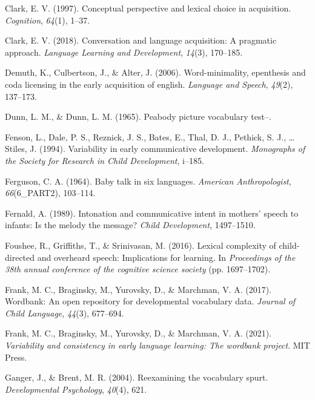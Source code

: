 \documentclass[10pt, letterpaper]{article}
\newenvironment{CSLReferences}%
  {}%
  {\par}
\begin{document}
\begin{CSLReferences}{1}{0}
\leavevmode\hypertarget{ref-clark1997conceptual}{}%
Clark, E. V. (1997). Conceptual perspective and lexical choice in
acquisition. \emph{Cognition}, \emph{64}(1), 1--37.

\leavevmode\hypertarget{ref-clark2018conversation}{}%
Clark, E. V. (2018). Conversation and language acquisition: A pragmatic
approach. \emph{Language Learning and Development}, \emph{14}(3),
170--185.

\leavevmode\hypertarget{ref-demuth2006word}{}%
Demuth, K., Culbertson, J., \& Alter, J. (2006). Word-minimality,
epenthesis and coda licensing in the early acquisition of english.
\emph{Language and Speech}, \emph{49}(2), 137--173.

\leavevmode\hypertarget{ref-dunn1965peabody}{}%
Dunn, L. M., \& Dunn, L. M. (1965). Peabody picture vocabulary test--.

\leavevmode\hypertarget{ref-fenson1994variability}{}%
Fenson, L., Dale, P. S., Reznick, J. S., Bates, E., Thal, D. J.,
Pethick, S. J., \ldots{} Stiles, J. (1994). Variability in early
communicative development. \emph{Monographs of the Society for Research
in Child Development}, i--185.

\leavevmode\hypertarget{ref-ferguson1964baby}{}%
Ferguson, C. A. (1964). Baby talk in six languages. \emph{American
Anthropologist}, \emph{66}(6\_PART2), 103--114.

\leavevmode\hypertarget{ref-fernald1989intonation}{}%
Fernald, A. (1989). Intonation and communicative intent in mothers'
speech to infants: Is the melody the message? \emph{Child Development},
1497--1510.

\leavevmode\hypertarget{ref-foushee2016lexical}{}%
Foushee, R., Griffiths, T., \& Srinivasan, M. (2016). Lexical complexity
of child-directed and overheard speech: Implications for learning. In
\emph{Proceedings of the 38th annual conference of the cognitive science
society} (pp. 1697--1702).

\leavevmode\hypertarget{ref-frank2017wordbank}{}%
Frank, M. C., Braginsky, M., Yurovsky, D., \& Marchman, V. A. (2017).
Wordbank: An open repository for developmental vocabulary data.
\emph{Journal of Child Language}, \emph{44}(3), 677--694.

\leavevmode\hypertarget{ref-frank2021variability}{}%
Frank, M. C., Braginsky, M., Yurovsky, D., \& Marchman, V. A. (2021).
\emph{Variability and consistency in early language learning: The
wordbank project}. MIT Press.

\leavevmode\hypertarget{ref-ganger2004reexamining}{}%
Ganger, J., \& Brent, M. R. (2004). Reexamining the vocabulary spurt.
\emph{Developmental Psychology}, \emph{40}(4), 621.


\end{CSLReferences}
\end{document}
